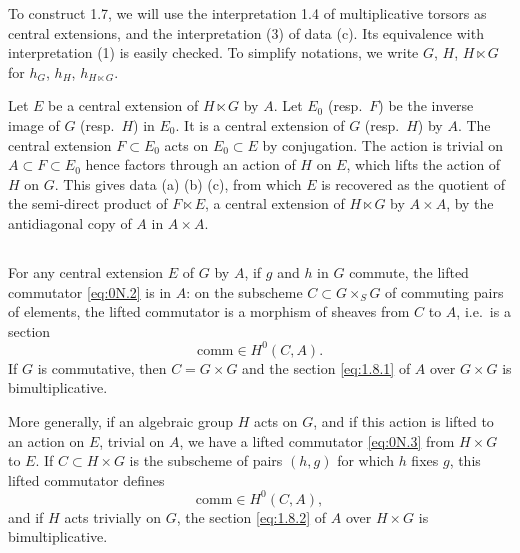 \documentclass[11pt,a4paper]{article}
\theoremstyle{plain}
\theoremstyle{definition}
\begin{document}
To construct 1.7, we will use the interpretation 1.4 of multiplicative torsors as central extensions, and the interpretation (3) of data (c). Its equivalence with interpretation (1) is easily checked. To simplify notations, we write $G$, $H$, $H \ltimes G$ for $h_G$, $h_H$, $h_{H \ltimes G}$.

Let $E$ be a central extension of $H \ltimes G$ by $A$. Let $E_0$ (resp.~$F$) be the inverse image of $G$ (resp.~$H$) in $E_0$. It is a central extension of $G$ (resp.~$H$) by $A$. The central extension $F \subset E_0$ acts on $E_0 \subset E$ by conjugation. The action is trivial on $A \subset F \subset E_0$ hence factors through an action of $H$ on $E$, which lifts the action of $H$ on $G$. This gives data (a) (b) (c), from which $E$ is recovered as the quotient of the semi-direct product of $F \ltimes E$, a central extension of $H \ltimes G$ by $A \times A$, by the antidiagonal copy of $A$ in $A \times A$.

\subsection{}
For any central extension $E$ of $G$ by $A$, if $g$ and $h$ in $G$ commute, the lifted commutator \eqref{eq:0N.2} is in $A$: on the subscheme $C \subset G \times_S G$ of commuting pairs of elements, the lifted commutator is a morphism of sheaves from $C$ to $A$, i.e.~is a section
\begin{equation}\label{eq:1.8.1}
\mathrm{comm} \in H^0(C, A).
\end{equation}
If $G$ is commutative, then $C = G \times G$ and the section \eqref{eq:1.8.1} of $A$ over $G \times G$ is bimultiplicative.

More generally, if an algebraic group $H$ acts on $G$, and if this action is lifted to an action on $E$, trivial on $A$, we have a lifted commutator \eqref{eq:0N.3} from $H \times G$ to $E$. If $C \subset H \times G$ is the subscheme of pairs $(h,g)$ for which $h$ fixes $g$, this lifted commutator defines
\begin{equation}\label{eq:1.8.2}
\mathrm{comm} \in H^0(C, A),
\end{equation}
and if $H$ acts trivially on $G$, the section \eqref{eq:1.8.2} of $A$ over $H \times G$ is bimultiplicative.
\end{document}
